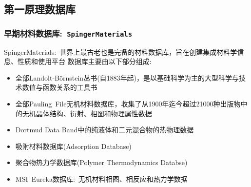 \subsection{第一原理数据库}
\frame
{
	\frametitle{早期材料数据库:~\tt{SpingerMaterials}}
\textrm{SpingerMaterials}:~世界上最古老也是完备的材料数据库，旨在创建集成材料学信息、性质和使用平台
\vskip 3pt
数据库主要由以下部分组成:
\begin{itemize}
	\item 全部\textrm{Landolt-B{\"o}rnstein}丛书(自\textrm{1883}年起)，是以基础科学为主的大型科学与技术数值与函数关系的工具书
	\item 全部\textrm{Pauling~File}无机材料数据库，收集了从\textrm{1900}年迄今超过\textrm{21000}种出版物中的无机晶体结构、衍射、相图和物理属性数据
	\item \textrm{Dortmud Data Band}中的纯液体和二元混合物的热物理数据
	\item 吸附材料数据库\textrm{(Adsorption Database)}
	\item 聚合物热力学数据库\textrm{(Polymer Thermodynamics Databse)}
	\item \textrm{MSI~Eureka}数据库:~无机材料相图、相反应和热力学数据
\end{itemize}
}


